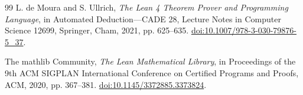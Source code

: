 \begin{thebibliography}{99}
L. de Moura and S. Ullrich,
\emph{The Lean 4 Theorem Prover and Programming Language},
in Automated Deduction---CADE 28, Lecture Notes in Computer Science 12699,
Springer, Cham, 2021, pp. 625--635.
\href{https://doi.org/10.1007/978-3-030-79876-5_37}{doi:10.1007/978-3-030-79876-5\_37}.

The mathlib Community,
\emph{The Lean Mathematical Library},
in Proceedings of the 9th ACM SIGPLAN International Conference on Certified
Programs and Proofs, ACM, 2020, pp. 367--381.
\href{https://doi.org/10.1145/3372885.3373824}{doi:10.1145/3372885.3373824}.

\end{thebibliography}
